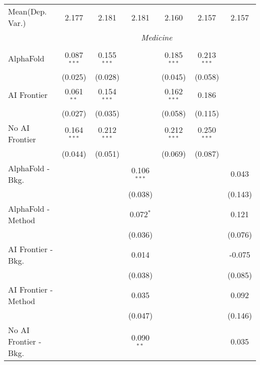 \begin{tabular}{lcccccc}
Mean(Dep. Var.) & 2.177 & 2.181 & 2.181 & 2.160 & 2.157 & 2.157 \\
 & \multicolumn{6}{c}{\textit{Medicine}} \\ \\
   AlphaFold               & 0.087$^{***}$ & 0.155$^{***}$ &               & 0.185$^{***}$ & 0.213$^{***}$ &   \\   
                           & (0.025)       & (0.028)       &               & (0.045)       & (0.058)       &   \\   
   AI Frontier             & 0.061$^{**}$  & 0.154$^{***}$ &               & 0.162$^{***}$ & 0.186         &   \\   
                           & (0.027)       & (0.035)       &               & (0.058)       & (0.115)       &   \\   
   No AI Frontier          & 0.164$^{***}$ & 0.212$^{***}$ &               & 0.212$^{***}$ & 0.250$^{***}$ &   \\   
                           & (0.044)       & (0.051)       &               & (0.069)       & (0.087)       &   \\   
   AlphaFold - Bkg.        &               &               & 0.106$^{***}$ &               &               & 0.043\\   
                           &               &               & (0.038)       &               &               & (0.143)\\   
   AlphaFold - Method      &               &               & 0.072$^{*}$   &               &               & 0.121\\   
                           &               &               & (0.036)       &               &               & (0.076)\\   
   AI Frontier - Bkg.      &               &               & 0.014         &               &               & -0.075\\   
                           &               &               & (0.038)       &               &               & (0.085)\\   
   AI Frontier - Method    &               &               & 0.035         &               &               & 0.092\\   
                           &               &               & (0.047)       &               &               & (0.146)\\   
   No AI Frontier - Bkg.   &               &               & 0.090$^{**}$  &               &               & 0.035\\   

\end{tabular}
